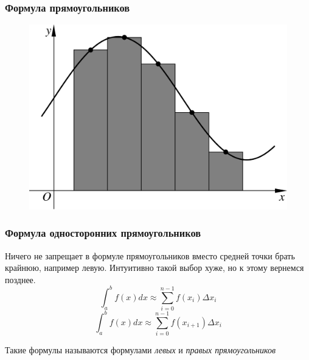 \documentclass[apectratio=43,unicode]{beamer}
\begin{document}
\begin{frame}
\frametitle{Формула прямоугольников}
	\begin{figure}%
	\includegraphics[height=.8\textheight]{rect.pdf}%
	\end{figure}
\end{frame}

\begin{frame}
\frametitle{Формула односторонних прямоугольников}
	Ничего не запрещает в формуле прямоугольников вместо средней точки брать крайнюю, например левую.
	Интуитивно такой выбор хуже, но к этому вернемся позднее.
	\[
	\int_a^b f(x) dx \approx \sum_{i=0}^{n-1} f\left(x_i\right)\Delta x_i
	\]
	\[
	\int_a^b f(x) dx \approx \sum_{i=0}^{n-1} f\left(x_{i+1}\right)\Delta x_i
	\]

	\pause

	Такие формулы называются формулами \emph{левых} и \emph{правых прямоугольников}
\end{frame}
\end{document}
